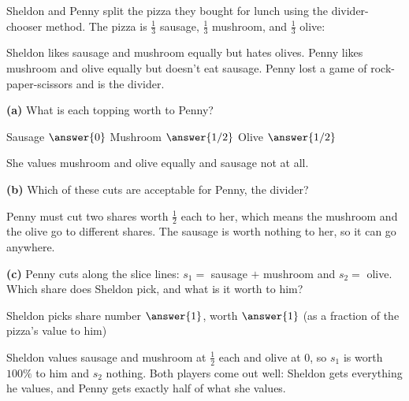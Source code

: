 \documentclass[12pt]{ximera}
\begin{document}
\begin{problem}
Sheldon and Penny split the pizza they bought for lunch using the divider-chooser method.
The pizza is $\frac13$ sausage, $\frac13$ mushroom, and $\frac13$ olive:
\begin{center}
\end{center}
Sheldon likes sausage and mushroom equally but hates olives. Penny likes mushroom and
olive equally but doesn't eat sausage. Penny lost a game of rock-paper-scissors and is
the divider.

\begin{prompt}
\textbf{(a)} What is each topping worth to Penny?

Sausage $\answer{0}$ \quad Mushroom $\answer{1/2}$ \quad Olive $\answer{1/2}$
\begin{feedback}
She values mushroom and olive equally and sausage not at all.
\end{feedback}
\end{prompt}

\begin{prompt}
\textbf{(b)} Which of these cuts are acceptable for Penny, the divider?
\begin{selectAll}
\end{selectAll}
\begin{feedback}
Penny must cut two shares worth $\frac12$ each to her, which means the mushroom and the
olive go to different shares. The sausage is worth nothing to her, so it can go
anywhere.
\end{feedback}
\end{prompt}

\begin{prompt}
\textbf{(c)} Penny cuts along the slice lines: $s_1=$ sausage $+$ mushroom and $s_2=$
olive. Which share does Sheldon pick, and what is it worth to him?

Sheldon picks share number $\answer{1}$, worth $\answer{1}$ (as a fraction of the pizza's value to him)
\begin{feedback}
Sheldon values sausage and mushroom at $\frac12$ each and olive at $0$, so $s_1$ is
worth $100\%$ to him and $s_2$ nothing. Both players come out well: Sheldon gets
everything he values, and Penny gets exactly half of what she values.
\end{feedback}
\end{prompt}
\end{problem}
\end{document}
